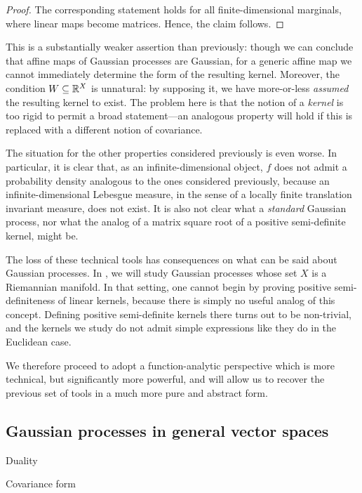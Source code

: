 \documentclass[11pt]{book}
\begin{document}
\begin{proof}
The corresponding statement holds for all finite-dimensional marginals, where linear maps become matrices. Hence, the claim follows.
\end{proof}

This is a substantially weaker assertion than previously: though we can conclude that affine maps of Gaussian processes are Gaussian, for a generic affine map we cannot immediately determine the form of the resulting kernel.
Moreover, the condition $W \subseteq \mathbb{R}^X$ is unnatural: by supposing it, we have more-or-less \emph{assumed} the resulting kernel to exist.
The problem here is that the notion of a \emph{kernel} is too rigid to permit a broad statement---an analogous property will hold if this is replaced with a different notion of covariance.

The situation for the other properties considered previously is even worse.
In particular, it is clear that, as an infinite-dimensional object, $f$ does not admit a probability density analogous to the ones considered previously, because an infinite-dimensional Lebesgue measure, in the sense of a locally finite translation invariant measure, does not exist.
It is also not clear what a \emph{standard} Gaussian process, nor what the analog of a matrix square root of a positive semi-definite kernel, might be.

The loss of these technical tools has consequences on what can be said about Gaussian processes.
In , we will study Gaussian processes whose set $X$ is a Riemannian manifold.
In that setting, one cannot begin by proving positive semi-definiteness of linear kernels, because there is simply no useful analog of this concept.
Defining positive semi-definite kernels there turns out to be non-trivial, and the kernels we study do not admit simple expressions like they do in the Euclidean case.

We therefore proceed to adopt a function-analytic perspective which is more technical, but significantly more powerful, and will allow us to recover the previous set of tools in a much more pure and abstract form.

\subsection{Gaussian processes in general vector spaces}
\label{sec:abstract-gp}

Duality

Covariance form
\end{document}
